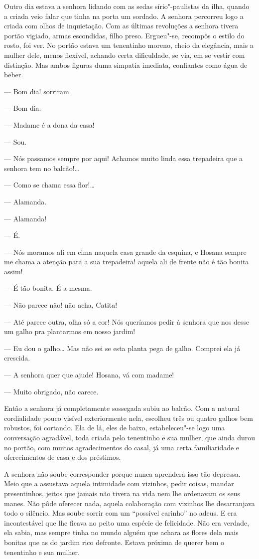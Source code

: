 Outro dia estava a senhora lidando com as sedas sírio"-paulistas da ilha,
quando a criada veio falar que tinha na porta um sordado. A senhora
percorreu logo a criada com olhos de inquietação. Com as últimas
revoluções a senhora tivera portão vigiado, armas escondidas, filho
preso. Ergueu"-se, recompôs o estilo do rosto, foi ver. No portão estava
um tenentinho moreno, cheio da elegância, mais a mulher dele, menos
flexível, achando certa dificuldade, se via, em se vestir com distinção.
Mas ambos figuras duma simpatia imediata, confiantes como água de beber.

--- Bom dia! sorriram.

--- Bom dia.

--- Madame é a dona da casa!

--- Sou.

--- Nós passamos sempre por aqui! Achamos muito linda essa trepadeira
que a senhora tem no balcão!\ldots{}

--- Como se chama essa flor!\ldots{}

--- Alamanda.

--- Alamanda!

--- É.

--- Nós moramos ali em cima naquela casa grande da esquina, e Hosana
sempre me chama a atenção para a sua trepadeira! aquela ali de frente
não é tão bonita assim!

--- É tão bonita. É a mesma.

--- Não parece não! não acha, Catita!

--- Até parece outra, olha só a cor! Nós queríamos pedir à senhora que
nos desse um galho pra plantarmos em nosso jardim!

--- Eu dou o galho\ldots{} Mas não sei se esta planta pega de galho. Comprei
ela já crescida.

--- A senhora quer que ajude! Hosana, vá com madame!

--- Muito obrigado, não carece.

Então a senhora já completamente sossegada subiu ao balcão. Com a
natural cordialidade pouco visível exteriormente nela, escolheu três ou
quatro galhos bem robustos, foi cortando. Ela de lá, eles de baixo,
estabeleceu"-se logo uma conversação agradável, toda criada pelo
tenentinho e sua mulher, que ainda durou no portão, com muitos
agradecimentos do casal, já uma certa familiaridade e oferecimentos de
casa e dos préstimos.

A senhora não soube corresponder porque nunca aprendera isso tão
depressa. Meio que a assustava aquela intimidade com vizinhos, pedir
coisas, mandar presentinhos, jeitos que jamais não tivera na vida nem
lhe ordenavam os seus manes. Não pôde oferecer nada, aquela colaboração
com vizinhos lhe desarranjava todo o silêncio. Mas soube sorrir com um
``possível carinho'' no adeus. E era incontestável que lhe ficava no peito
uma espécie de felicidade. Não era verdade, ela sabia, mas sempre tinha
no mundo alguém que achara as flores dela mais bonitas que as do jardim
rico defronte. Estava próxima de querer bem o tenentinho e sua mulher.

